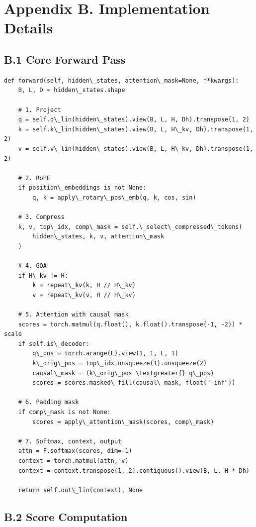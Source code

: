 \section{Appendix B. Implementation Details}

\subsection{B.1 Core Forward Pass}

\begin{lstlisting}
def forward(self, hidden\_states, attention\_mask=None, **kwargs):
    B, L, D = hidden\_states.shape
    
    # 1. Project
    q = self.q\_lin(hidden\_states).view(B, L, H, Dh).transpose(1, 2)
    k = self.k\_lin(hidden\_states).view(B, L, H\_kv, Dh).transpose(1, 2)
    v = self.v\_lin(hidden\_states).view(B, L, H\_kv, Dh).transpose(1, 2)
    
    # 2. RoPE
    if position\_embeddings is not None:
        q, k = apply\_rotary\_pos\_emb(q, k, cos, sin)
    
    # 3. Compress
    k, v, top\_idx, comp\_mask = self.\_select\_compressed\_tokens(
        hidden\_states, k, v, attention\_mask
    )
    
    # 4. GQA
    if H\_kv != H:
        k = repeat\_kv(k, H // H\_kv)
        v = repeat\_kv(v, H // H\_kv)
    
    # 5. Attention with causal mask
    scores = torch.matmul(q.float(), k.float().transpose(-1, -2)) * scale
    if self.is\_decoder:
        q\_pos = torch.arange(L).view(1, 1, L, 1)
        k\_orig\_pos = top\_idx.unsqueeze(1).unsqueeze(2)
        causal\_mask = (k\_orig\_pos \textgreater{} q\_pos)
        scores = scores.masked\_fill(causal\_mask, float("-inf"))
    
    # 6. Padding mask
    if comp\_mask is not None:
        scores = apply\_attention\_mask(scores, comp\_mask)
    
    # 7. Softmax, context, output
    attn = F.softmax(scores, dim=-1)
    context = torch.matmul(attn, v)
    context = context.transpose(1, 2).contiguous().view(B, L, H * Dh)
    
    return self.out\_lin(context), None
\end{lstlisting}

\subsection{B.2 Score Computation}

